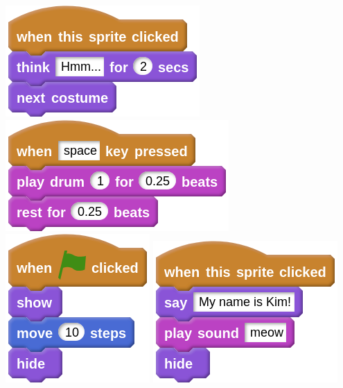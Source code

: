 \documentclass[letterpaper,12pt]{article}
\begin{document}
\includegraphics[scale=.4,valign=t]{q3_script0.png} \hspace{1cm}
\includegraphics[scale=.4,valign=t]{q3_script1.png} \hspace{1cm}
\includegraphics[scale=.4,valign=t]{q3_script2.png} \hspace{1cm}
\includegraphics[scale=.4,valign=t]{q3_script3.png} \hspace{1cm}
\end{document}
